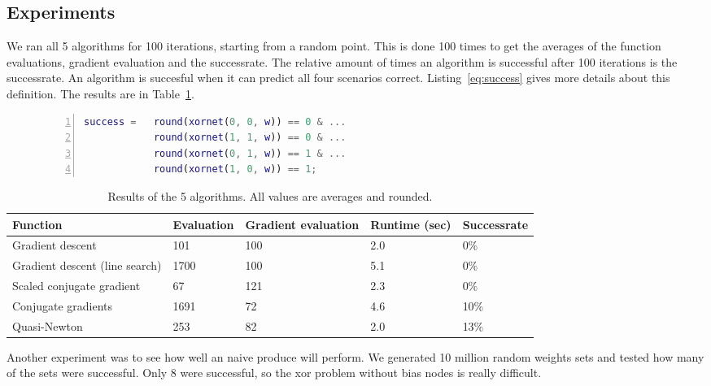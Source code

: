 \documentclass{article}
\begin{document}
\subsection{Experiments}
We ran all 5 algorithms for 100 iterations, starting from a random point. This is done 100 times to get the averages of the function evaluations, gradient evaluation and the successrate. The relative amount of times an algorithm is successful after 100 iterations is the successrate. An algorithm is succesful when it can predict all four scenarios correct. Listing~\ref{eq:success} gives more details about this definition. The results are in Table~\ref{table:results}. 

\begin{figure}
	\begin{lstlisting}[caption={Success condition of a set of weights.}, label={eq:success}, captionpos=b, language=matlab, numbers=left, tabsize=4, frame=single, basicstyle=\footnotesize, breaklines=true, deletekeywords={round}]
success = 	round(xornet(0, 0, w)) == 0 & ...
			round(xornet(1, 1, w)) == 0 & ... 
			round(xornet(0, 1, w)) == 1 & ...
			round(xornet(1, 0, w)) == 1;
	\end{lstlisting}
\end{figure}

\begin{table}[!h]
	\centering
	\begin{tabular}{| l | l | l | l | l |}
		\hline
		Function & Evaluation & Gradient evaluation & Runtime (sec) & Successrate \\ \hline
		Gradient descent & 101 & 100 & 2.0 & 0\% \\ \hline
		Gradient descent (line search) & 1700 & 100 & 5.1 & 0\% \\ \hline
		Scaled conjugate gradient & 67 & 121 & 2.3 & 0\% \\ \hline
		Conjugate gradients & 1691 & 72 & 4.6 & 10\% \\ \hline
		Quasi-Newton & 253 & 82 & 2.0 & 13\% \\ \hline
	\end{tabular}
	\caption{Results of the 5 algorithms. All values are averages and rounded.}
	\label{table:results}
\end{table}

Another experiment was to see how well an naive produce will perform. We generated 10 million random weights sets and tested how many of the sets were successful. Only 8 were successful, so the xor problem without bias nodes is really difficult. 
\end{document}
